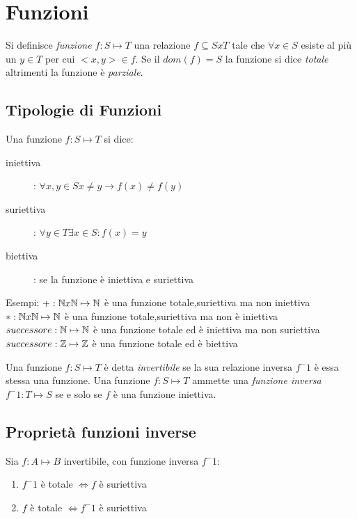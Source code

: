 \chapter{Funzioni}
Si definisce \textit{funzione $f:S \mapsto T$} una relazione $f \subseteq SxT$
tale che $\forall x \in S$ esiste al più un $y \in T$ per cui $<x,y> \in f$.\newline
Se il $dom(f) = S$ la funzione si dice \emph{totale} altrimenti la funzione è \emph{parziale}.

\section{Tipologie di Funzioni}
Una funzione $f:S \mapsto T$ si dice:
\begin{description}
    \item[iniettiva]: $\forall x,y \in S x \neq y \rightarrow f(x) \neq f(y)$
    \item[suriettiva]: $\forall y \in T \exists x \in S : f(x) = y$
    \item[biettiva]: se la funzione è iniettiva e suriettiva
\end{description}

Esempi:
$+:\mathbb{N} x \mathbb{N} \mapsto \mathbb{N}$ è una funzione totale,suriettiva ma non iniettiva
$*:\mathbb{N} x \mathbb{N} \mapsto \mathbb{N}$ è una funzione totale,suriettiva ma non è iniettiva
$successore:\mathbb{N} \mapsto \mathbb{N}$ è una funzione totale ed è iniettiva ma non suriettiva
$successore:\mathbb{Z} \mapsto \mathbb{Z}$ è una funzione totale ed è biettiva

Una funzione $f:S \mapsto T$ è detta \emph{invertibile} se la sua relazione inversa
$f ^ -1$ è essa stessa una funzione.\newline
Una funzione $f:S \mapsto T$ ammette una \emph{funzione inversa} $f ^ -1 :T \mapsto S$
se e solo se $f$ è una funzione iniettiva.

\section{Proprietà funzioni inverse}
Sia $f:A \mapsto B$ invertibile, con funzione inversa $f ^ -1$:
\begin{enumerate}
    \item $f^-1$ è totale $\iff f$ è suriettiva
    \item $f$ è totale $\iff f^-1$ è suriettiva
\end{enumerate}


